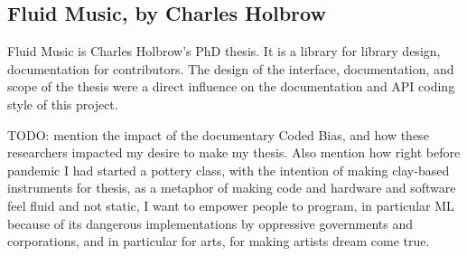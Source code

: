 \subsection{Fluid Music, by Charles Holbrow}

Fluid Music is Charles Holbrow's PhD thesis. It is a library for library design, documentation for contributors. The design of the interface, documentation, and scope of the thesis were a direct influence on the documentation and API coding style of this project.

TODO: mention the impact of the documentary Coded Bias, and how these researchers impacted my desire to make my thesis. Also mention how right before pandemic I had started a pottery class, with the intention of making clay-based instruments for thesis, as a metaphor of making code and hardware and software feel fluid and not static, I want to empower people to program, in particular \acrshort{ML} because of its dangerous implementations by oppressive governments and corporations, and in particular for arts, for making artists dream come true.
